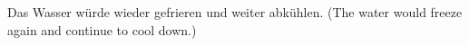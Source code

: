 Das Wasser würde wieder gefrieren und weiter abkühlen.  
(The water would freeze again and continue to cool down.)